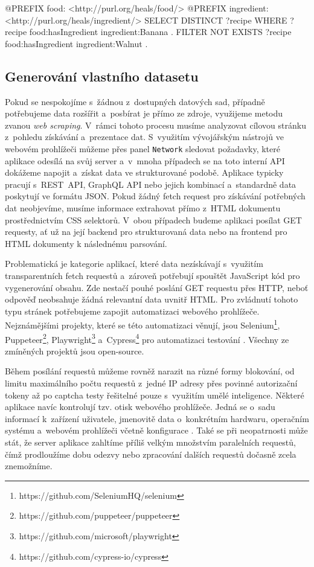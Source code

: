 \begin{code}
@PREFIX food: <http://purl.org/heals/food/>
@PREFIX ingredient: <http://purl.org/heals/ingredient/>
SELECT DISTINCT ?recipe
WHERE {
    ?recipe food:hasIngredient ingredient:Banana .
    FILTER NOT EXISTS {
        ?recipe food:hasIngredient ingredient:Walnut .
    }
}
\end{code}

\subsection{Generování vlastního datasetu}

Pokud se nespokojíme s~žádnou z~dostupných datových sad, případně potřebujeme data rozšířit a~posbírat je přímo ze zdroje, využijeme metodu zvanou \emph{web scraping}. V~rámci tohoto procesu musíme analyzovat cílovou stránku z~pohledu získávání a~prezentace dat. S~využitím vývojářským nástrojů ve webovém prohlížeči můžeme přes panel \texttt{Network} sledovat požadavky, které aplikace odesílá na svůj server a~v~mnoha případech se na toto interní API dokážeme napojit a~získat data ve strukturované podobě. Aplikace typicky pracují s~REST~API, GraphQL API nebo jejich kombinací a~standardně data poskytují ve formátu JSON. Pokud žádný fetch request pro získávání potřebných dat neobjevíme, musíme informace extrahovat přímo z~HTML dokumentu prostřednictvím CSS selektorů. V~obou případech budeme aplikaci posílat GET requesty, ať už na její backend pro strukturovaná data nebo na frontend pro HTML dokumenty k následnému parsování.

Problematická je kategorie aplikací, které data nezískávají s~využitím transparentních fetch requestů a~zároveň potřebují spouštět JavaScript kód pro vygenerování obsahu. Zde nestačí pouhé poslání GET requestu přes HTTP, neboť odpověď neobsahuje žádná relevantní data uvnitř HTML. Pro zvládnutí tohoto typu stránek potřebujeme zapojit automatizaci webového prohlížeče. Nejznámějšími projekty, které se této automatizaci věnují, jsou Selenium\footnote{https://github.com/SeleniumHQ/selenium}, Puppeteer\footnote{https://github.com/puppeteer/puppeteer}, Playwright\footnote{https://github.com/microsoft/playwright} a~Cypress\footnote{https://github.com/cypress-io/cypress} pro automatizaci testování \citep{selenium-ecosystem}. Všechny ze zmíněných projektů jsou open-source.

Během posílání requestů můžeme rovněž narazit na různé formy blokování, od limitu maximálního počtu requestů z~jedné IP adresy přes povinné autorizační tokeny až po captcha testy řešitelné pouze s~využitím umělé inteligence. Některé aplikace navíc kontrolují tzv. otisk webového prohlížeče. Jedná se o~sadu informací k~zařízení uživatele, jmenovitě data o~konkrétním hardwaru, operačním systému a~webovém prohlížeči včetně konfigurace \citep{browser-fingerprints}. Také se při neopatrnosti může stát, že server aplikace zahltíme příliš velkým množstvím paralelních requestů, čímž prodloužíme dobu odezvy nebo zpracování dalších requestů dočasně zcela znemožníme.

